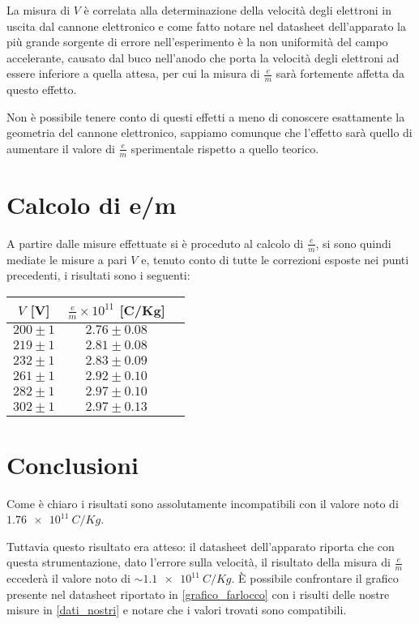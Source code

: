 La misura di $V$ è correlata alla determinazione della velocità degli elettroni in uscita dal cannone elettronico e come fatto notare nel datasheet dell'apparato la più grande sorgente di errore nell'esperimento è la non uniformità del campo accelerante, causato dal buco nell'anodo che porta la velocità degli elettroni ad essere inferiore a quella attesa, per cui la misura di $\tfrac{e}{m}$ sarà fortemente affetta da questo effetto.

Non è possibile tenere conto di questi effetti a meno di conoscere esattamente la geometria del cannone elettronico, sappiamo comunque che l'effetto sarà quello di aumentare il valore di  $\tfrac{e}{m}$ sperimentale rispetto a quello teorico.

\section{Calcolo di e/m}
A partire dalle misure effettuate si è proceduto al calcolo di $\tfrac{e}{m}$, si sono quindi mediate le misure a pari $V$ e, tenuto conto di tutte le correzioni esposte nei punti precedenti, i risultati sono i seguenti:

\begin{table}[H]
	\centering
	\begin{tabular}{ccc}
		\toprule
		$V$ [\si{\volt}] & 	$\frac{e}{m} \times 10^{11}$ [C/Kg] \\
		\midrule
$	200 \pm 1	$ & $	2.76 \pm 0.08	$ \\
$	219 \pm 1	$ & $	2.81 \pm 0.08	$ \\
$	232 \pm 1	$ & $	2.83 \pm 0.09	$ \\
$	261 \pm 1	$ & $	2.92 \pm 0.10	$ \\
$	282 \pm 1	$ & $	2.97 \pm 0.10	$ \\
$	302 \pm 1	$ & $	2.97 \pm 0.13	$ \\
\bottomrule
\end{tabular}
\end{table}

\section{Conclusioni}
Come è chiaro i risultati sono assolutamente incompatibili con il valore noto di $\SI{1.76e11}{C/Kg}$.

Tuttavia questo risultato era atteso: il datasheet dell'apparato riporta che con questa strumentazione, dato l'errore sulla velocità, il risultato della misura di $\tfrac{e}{m}$ eccederà il valore noto di $\sim \SI{1.1e11}{C/Kg}$.
È possibile confrontare il grafico presente nel datasheet riportato in \figurename{ \ref{grafico_farlocco}} con i risulti delle nostre misure in \figurename{ \ref{dati_nostri}} e notare che i valori trovati sono compatibili.

